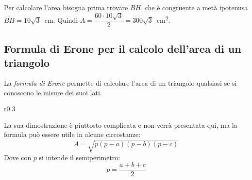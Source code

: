 \begin{exrig}
\begin{esempio}
Per calcolare l'area bisogna prima trovare $\overline{BH}$, che è 
congruente a metà ipotenusa $\overline{BH}=10\sqrt{3}$~cm. Quindi 
$A=\dfrac{60\cdot 10\sqrt{3}}{2}=300\sqrt{3}$~cm\textsuperscript{2}.
\end{esempio}
\end{exrig}

\subsection{Formula di Erone per il calcolo dell'area di un triangolo}

La \emph{formula di Erone} permette di calcolare l'area di un 
triangolo qualsiasi se si conoscono le misure dei suoi lati.

\begin{wrapfigure}{r}{0.3\textwidth}
        \centering
        \vspace{10pt}
\end{wrapfigure}

La sua dimostrazione è piuttosto complicata e non verrà presentata qui, ma la 
formula può essere utile in alcune circostanze:
\[A=\sqrt{p(p-a)(p-b)(p-c)}\]
Dove con \(p\) si intende il semiperimetro:
\[p= \dfrac{a+b+c}{2}\]

